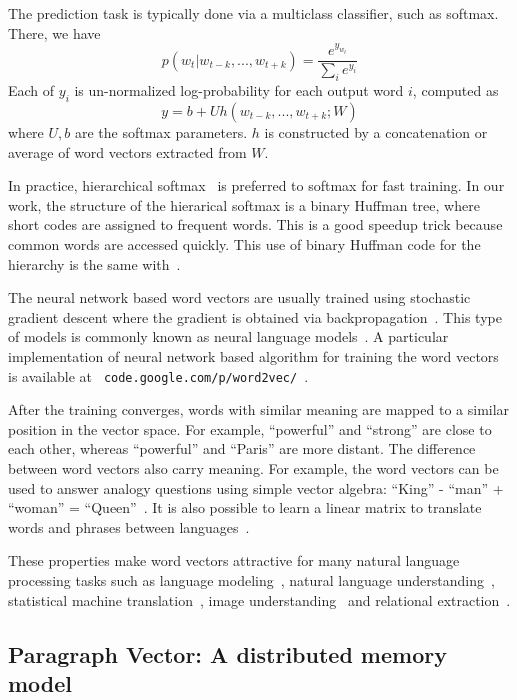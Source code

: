 \documentclass{article}
\begin{document}
The prediction task is typically done via a multiclass
classifier, such as softmax. There, we have
\[
p (w_t | w_{t-k}, ..., w_{t+k}) = \frac{e^{y_{w_{t}}}}{\sum_i{e^{y_i}}}
\]
Each of $y_i$ is un-normalized log-probability for each output word $i$, computed as
\begin{equation}
y = b + U h(w_{t-k}, ..., w_{t+k}; W)
\label{eq:formal}
\end{equation}
where $U, b$ are the softmax parameters. $h$ is constructed by a
concatenation or average of word vectors extracted from $W$.

In practice, hierarchical
softmax~\cite{hsoft_first,mnih2008scalable,phrases0} is preferred to
softmax for fast training. In our work, the structure of the
hierarical softmax is a binary Huffman tree, where short codes are
assigned to frequent words. This is a good speedup trick because
common words are accessed quickly. This use of binary Huffman code for
the hierarchy is the same with~\cite{phrases0}.


The neural network based word vectors are usually trained using
stochastic gradient descent where the gradient is obtained via
backpropagation~\cite{rumelhart1986learning}. This type of models is
commonly known as neural language models~\cite{bengio2006neural}.  A
particular implementation of neural network based algorithm for
training the word vectors is available at {\tt
  code.google.com/p/word2vec/}~\cite{mikolov}.



After the training converges, words with similar meaning are mapped to
a similar position in the vector space. For example, ``powerful'' and
``strong'' are close to each other, whereas ``powerful'' and ``Paris''
are more distant. The difference between word vectors also carry
meaning. For example, the word vectors can be used to answer analogy
questions using simple vector algebra: ``King'' - ``man'' + ``woman''
= ``Queen''~\cite{mikolov2013naacl}.  It is also possible to learn a
linear matrix to translate words and phrases between
languages~\cite{MikolovLS13}.

These properties make word vectors attractive for many natural
language processing tasks such as language
modeling~\cite{bengio2006neural,mikolov2012}, natural language
understanding~\cite{collobert2008unified,Zhila}, statistical machine
translation~\cite{MikolovLS13,zou13}, image
understanding~\cite{Frome13} and relational
extraction~\cite{Socher13b}.

\subsection{Paragraph Vector: A distributed memory model}
\end{document}

